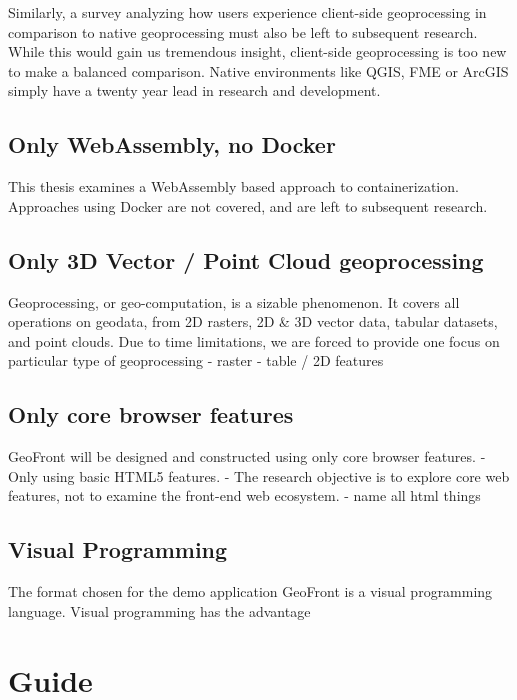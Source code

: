 Similarly, a survey analyzing how users experience client-side geoprocessing in comparison to native geoprocessing must also be left to subsequent research. While this would gain us tremendous insight, client-side geoprocessing is too new to make a balanced comparison. Native environments like QGIS, FME or ArcGIS simply have a twenty year lead in research and development. 



\subsection {Only WebAssembly, no Docker}
This thesis examines a WebAssembly based approach to containerization. Approaches using Docker are not covered, and are left to subsequent research.

\subsection*{ Only 3D Vector / Point Cloud geoprocessing}
Geoprocessing, or geo-computation, is a sizable phenomenon. 
It covers all operations on geodata, from 2D rasters, 2D \& 3D vector data, tabular datasets, and point clouds. 
Due to time limitations, we are forced to provide one focus on particular type of geoprocessing
- raster
- table / 2D features

\subsection*{ Only core browser features }
GeoFront will be designed and constructed using only core browser features. 
- Only using basic HTML5 features.
- The research objective is to explore core web features, not to examine the front-end web ecosystem. 
- name all html things

\subsection*{ Visual Programming }
The format chosen for the demo application GeoFront is a visual programming language. Visual programming has the advantage 

\section{Guide}

